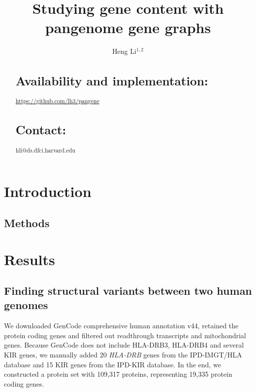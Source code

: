 \documentclass{bioinfo}
\begin{document}

\title[Pangene graphs]{Studying gene content with pangenome gene graphs}
\author[Li]{Heng Li$^{1,2}$}
\address{$^1$Dana-Farber Cancer Institute, 450 Brookline Ave, Boston, MA 02215, USA,
$^2$Harvard Medical School, 10 Shattuck St, Boston, MA 02215, USA}

\maketitle

\begin{abstract}

\section{Availability and implementation:}
\href{https://github.com/lh3/pangene}{https://github.com/lh3/pangene}

\section{Contact:} hli@ds.dfci.harvard.edu
\end{abstract}

\section*{Introduction}

\begin{methods}
\section*{Methods}
\end{methods}

\section*{Results}

\subsection*{Finding structural variants between two human genomes}

We downloaded GenCode comprehensive human annotation v44,
retained the protein coding genes and filtered out readthrough transcripts and mitochondrial genes.
Because GenCode does not include HLA-DRB3, HLA-DRB4 and several KIR genes,
we manually added 20 {\it HLA-DRB} genes from the IPD-IMGT/HLA database and
15 KIR genes from the IPD-KIR database.
In the end, we constructed a protein set with 109,317 proteins, representing 19,335 protein coding genes.
\end{document}
